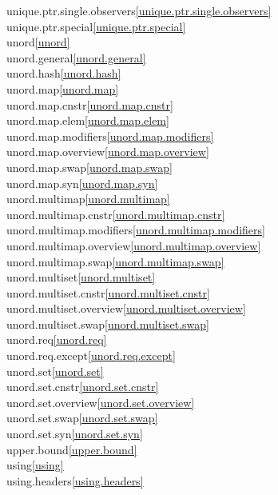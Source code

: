 \begin{multicols}{2}
unique.ptr.single.observers\quad\ref{unique.ptr.single.observers}\\
unique.ptr.special\quad\ref{unique.ptr.special}\\
unord\quad\ref{unord}\\
unord.general\quad\ref{unord.general}\\
unord.hash\quad\ref{unord.hash}\\
unord.map\quad\ref{unord.map}\\
unord.map.cnstr\quad\ref{unord.map.cnstr}\\
unord.map.elem\quad\ref{unord.map.elem}\\
unord.map.modifiers\quad\ref{unord.map.modifiers}\\
unord.map.overview\quad\ref{unord.map.overview}\\
unord.map.swap\quad\ref{unord.map.swap}\\
unord.map.syn\quad\ref{unord.map.syn}\\
unord.multimap\quad\ref{unord.multimap}\\
unord.multimap.cnstr\quad\ref{unord.multimap.cnstr}\\
unord.multimap.modifiers\quad\ref{unord.multimap.modifiers}\\
unord.multimap.overview\quad\ref{unord.multimap.overview}\\
unord.multimap.swap\quad\ref{unord.multimap.swap}\\
unord.multiset\quad\ref{unord.multiset}\\
unord.multiset.cnstr\quad\ref{unord.multiset.cnstr}\\
unord.multiset.overview\quad\ref{unord.multiset.overview}\\
unord.multiset.swap\quad\ref{unord.multiset.swap}\\
unord.req\quad\ref{unord.req}\\
unord.req.except\quad\ref{unord.req.except}\\
unord.set\quad\ref{unord.set}\\
unord.set.cnstr\quad\ref{unord.set.cnstr}\\
unord.set.overview\quad\ref{unord.set.overview}\\
unord.set.swap\quad\ref{unord.set.swap}\\
unord.set.syn\quad\ref{unord.set.syn}\\
upper.bound\quad\ref{upper.bound}\\
using\quad\ref{using}\\
using.headers\quad\ref{using.headers}\\

\end{multicols}
